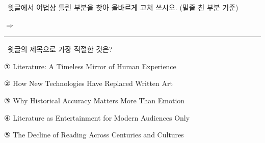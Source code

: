 \documentclass[11pt,a4paper]{article}
\newcommand{\qno}[1]{\par\vspace{8pt}\noindent{\sffamily\bfseries #1.}\ }
\newcommand{\instr}[1]{{\sffamily #1}\par\vspace{3pt}}
\begin{document}
\qno{3}\instr{[서술형] 윗글에서 어법상 틀린 부분을 찾아 올바르게 고쳐 쓰시오. (밑줄 친 부분 기준)}

\vspace{4pt}
\noindent $\Rightarrow$ \rule{\linewidth}{0.4pt}

\qno{4}\instr{윗글의 제목으로 가장 적절한 것은?}
\begin{choices}
\item ① Literature: A Timeless Mirror of Human Experience
\item ② How New Technologies Have Replaced Written Art
\item ③ Why Historical Accuracy Matters More Than Emotion
\item ④ Literature as Entertainment for Modern Audiences Only
\item ⑤ The Decline of Reading Across Centuries and Cultures
\end{choices}
\end{document}
